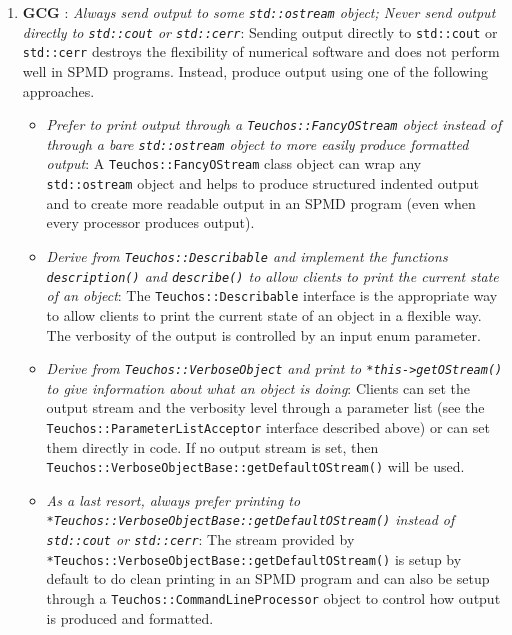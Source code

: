 \begin{enumerate}
{}\item{}\textbf{GCG }:
{}\textit{Always send output to some {}\texttt{std\-::ostream} object;
Never send output directly to {}\texttt{std\-::cout} or {}\texttt{std\-::cerr}}:
Sending output directly to {}\texttt{std\-::cout} or {}\texttt{std\-::cerr}
destroys the flexibility of numerical software and does not perform well in
SPMD programs.  Instead, produce output using one of the following approaches.

\begin{itemize}

{}\item\textit{Prefer to print output through a
{}\texttt{Teuchos\-::Fancy\-OStream} object instead of through a bare
{}\texttt{std\-::ostream} object to more easily produce formatted output}: A
{}\texttt{Teuchos\-::Fancy\-OStream} class object can wrap any
{}\texttt{std\-::ostream} object and helps to produce structured indented
output and to create more readable output in an SPMD program (even when every
processor produces output).

{}\item\textit{Derive from {}\texttt{Teuchos\-::Describable} and implement the
functions {}\texttt{description()} and {}\texttt{describe()} to allow clients
to print the current state of an object}: The
{}\texttt{Teuchos\-::Describable} interface is the appropriate way to allow
clients to print the current state of an object in a flexible way.  The
verbosity of the output is controlled by an input enum parameter.

{}\item\textit{Derive from {}\texttt{Teuchos\-::Verbose\-Object} and print to
{}\texttt{*this->getOStream()} to give information about what an object is
doing}: Clients can set the output stream and the verbosity level through a
parameter list (see the {}\texttt{Teuchos\-::ParameterListAcceptor} interface
described above) or can set them directly in code.  If no output stream is
set, then
{}\texttt{Teuchos\-::Verbose\-Object\-Base\-::get\-Default\-OStream()} will be
used.

{}\item\textit{As a last resort, always prefer printing to
{}\texttt{*Teuchos\-::Verbose\-Object\-Base\-::get\-Default\-OStream()}
instead of {}\texttt{std\-::cout} or {}\texttt{std\-::cerr}}: The stream
provided by
{}\texttt{*Teuchos\-::Verbose\-Object\-Base\-::get\-Default\-OStream()} is
setup by default to do clean printing in an SPMD program and can also be setup
through a {}\texttt{Teuchos\-::Command\-Line\-Processor} object to control how
output is produced and formatted.


\end{itemize}
\end{enumerate}
